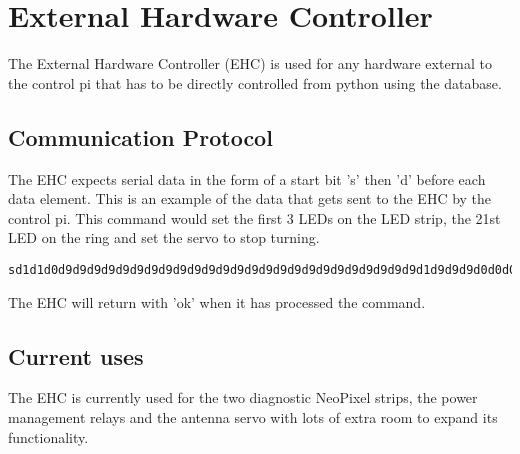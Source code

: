 \section{External Hardware Controller}
The External Hardware Controller (EHC) is used for any hardware external to the control pi that has to be directly controlled from python using the database.

\subsection{Communication Protocol}
The EHC expects serial data in the form of a start bit 's' then 'd' before each data element. This is an example of the data that gets sent to the EHC by the control pi. This command would set the first 3 LEDs on the LED strip, the 21st LED on the ring and set the servo to stop turning.
\begin{lstlisting}
sd1d1d0d9d9d9d9d9d9d9d9d9d9d9d9d9d9d9d9d9d9d9d9d9d9d9d9d9d1d9d9d9d0d0d0d0d75 
\end{lstlisting}
\noindent
The EHC will return with 'ok' when it has processed the command.

\subsection{Current uses}
The EHC is currently used for the two diagnostic NeoPixel strips, the power management relays and the antenna servo with lots of extra room to expand its functionality.


